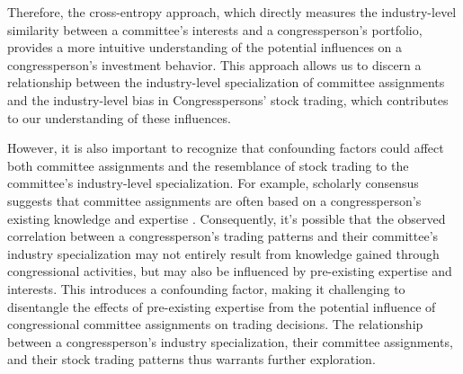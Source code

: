 \documentclass[15pt,letterpaper]{article}
\begin{document}
Therefore, the cross-entropy approach, which directly measures the industry-level similarity between a committee's interests and a congressperson's portfolio, provides a more intuitive understanding of the potential influences on a congressperson's investment behavior. This approach allows us to discern a relationship between the industry-level specialization of committee assignments and the industry-level bias in Congresspersons' stock trading, which contributes to our understanding of these influences. 

However, it is also important to recognize that confounding factors could affect both committee assignments and the resemblance of stock trading to the committee's industry-level specialization.
For example, scholarly consensus suggests that committee assignments are often based on a congressperson's existing knowledge and expertise \citep{10.2307/40709444, 10.2307/2111156, kiewiet1991logic, krehbiel1992information, curry2018knowledge}. Consequently, it's possible that the observed correlation between a congressperson's trading patterns and their committee's industry specialization may not entirely result from knowledge gained through congressional activities, but may also be influenced by pre-existing expertise and interests. This introduces a confounding factor, making it challenging to disentangle the effects of pre-existing expertise from the potential influence of congressional committee assignments on trading decisions. The relationship between a congressperson's industry specialization, their committee assignments, and their stock trading patterns thus warrants further exploration.

\end{document}
